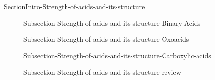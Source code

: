 \documentclass[main.tex]{subfiles}
\begin{document}
 \section{\color{blue!30!black}{Molecular mechanisms behind acid-base strength}}{SectionIntro-Strength-of-acids-and-its-structure}
\sloppy\begin{description}
\item[] {Subsection-Strength-of-acids-and-its-structure-Binary-Acids}
\item[] {Subsection-Strength-of-acids-and-its-structure-Oxoacids}
\item[] {Subsection-Strength-of-acids-and-its-structure-Carboxylic-acids}
\item[] {Subsection-Strength-of-acids-and-its-structure-review}

 \end{description}


 
 
\end{document}
